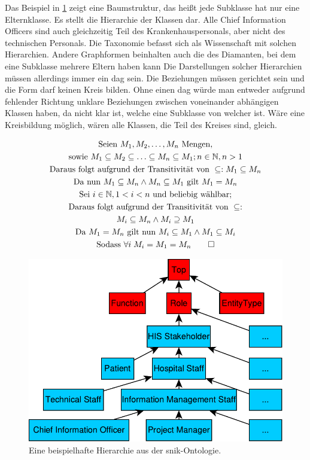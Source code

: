 Das Beispiel in \cref{fig:snikhierarchy} zeigt eine Baumstruktur, das heißt jede Subklasse hat nur eine Elternklasse.
Es stellt die Hierarchie der Klassen dar.
Alle Chief Information Officers sind auch gleichzeitig Teil des Krankenhauspersonals, aber nicht des technischen Personals.
Die Taxonomie befasst sich als Wissenschaft mit solchen Hierarchien.
Andere Graphformen beinhalten auch die des Diamanten, bei dem eine Subklasse mehrere Eltern haben kann
Die Darstellungen solcher Hierarchien müssen allerdings immer ein \ac{dag} sein.
Die Beziehungen müssen gerichtet sein und die Form darf keinen Kreis bilden.
Ohne einen \ac{dag} würde man entweder aufgrund fehlender Richtung unklare Beziehungen zwischen voneinander abhängigen Klassen haben, da nicht klar ist, welche eine Subklasse von welcher ist.
Wäre eine Kreisbildung möglich, wären alle Klassen, die Teil des Kreises sind, gleich.

\begin{gather*}
\text{Seien } M_1, M_2, \ldots, M_n \text{ Mengen,} \\
\text{sowie } M_1 \subseteq M_2 \subseteq \ldots \subseteq M_n \subseteq M_1; n \in \mathbb{N}, n > 1 \\
\text{Daraus folgt aufgrund der Transitivität von } \subseteq: M_1 \subseteq M_n \\
\text{Da nun } M_1 \subseteq M_n \land M_n \subseteq M_1 \text{ gilt } M_1 = M_n \\
\text{Sei } i \in \mathbb{N}, 1 < i < n \text{ und beliebig wählbar;} \\
\text{Daraus folgt aufgrund der Transitivität von } \subseteq: \\
M_i \subseteq M_n \land M_i \supseteq M_1 \\
\text{Da } M_1 = M_n \text{ gilt nun } M_i \subseteq M_1 \land M_1 \subseteq M_i \\
\text{Sodass }\forall i\; M_i = M_1 = M_n \qed
\end{gather*}

\begin{figure}[ht]%
\centering
\includegraphics[width=\textwidth, height=\textheight, keepaspectratio]{Images/hierarchy.pdf}
\caption[Beispiel für Hierarchie]{Eine beispielhafte Hierarchie aus der \acs{snik}-Ontologie.}
\label{fig:snikhierarchy}
\end{figure}

